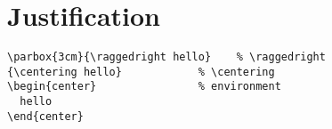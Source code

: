 \chapter{Justification}
\begin{lstlisting}
\parbox{3cm}{\raggedright hello}    % \raggedright
{\centering hello}            % \centering
\begin{center}                % environment
  hello
\end{center}
\end{lstlisting}



